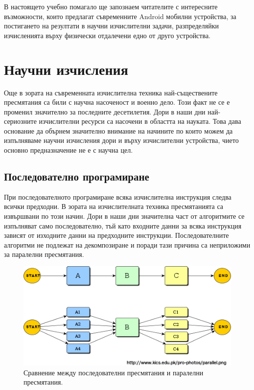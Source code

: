 \documentclass[book,14pt,oneside,openany]{memoir}
\begin{document}
В настоящето учебно помагало ще запознаем читателите с интересните възможности, които предлагат съвременните Android мобилни устройства, за постигането на резултати в научни изчислителни задачи, разпределяйки изчисленията върху физически отдалечени едно от друго устройства. 

\newpage
\chapter{Научни изчисления}

Още в зората на съвременната изчислителна техника най-съществените пресмятания са били с научна насоченост и военно дело. Този факт не се е променил значително за последните десетилетия. Дори в наши дни най-сериозните изчислителни ресурси са насочени в областта на науката. Това дава основание да обърнем значително внимание на начините по които можем да изпълняваме научни изчисления дори и върху изчислителни устройства, чието основно предназначение не е с научна цел. 

\section{Последователно програмиране}

При последователното програмиране всяка изчислителна инструкция следва всички предходни. В зората на изчислителната техника пресмятанията са извършвани по този начин. Дори в наши дни значителна част от алгоритмите се изпълняват само последователно, тъй като входните данни за всяка инструкция зависят от изходните данни на предходните инструкции. Последователните алгоритми не подлежат на декомпозиране и поради тази причина са неприложими за паралелни пресмятания. 

\begin{figure}[h!]
  \centering
  \includegraphics[width=1.0\linewidth]{./images/pic0001.png}
  \caption{Сравнение между последователни пресмятания и паралелни пресмятания.}
\label{fig:pic0001}
\end{figure}
\end{document}
